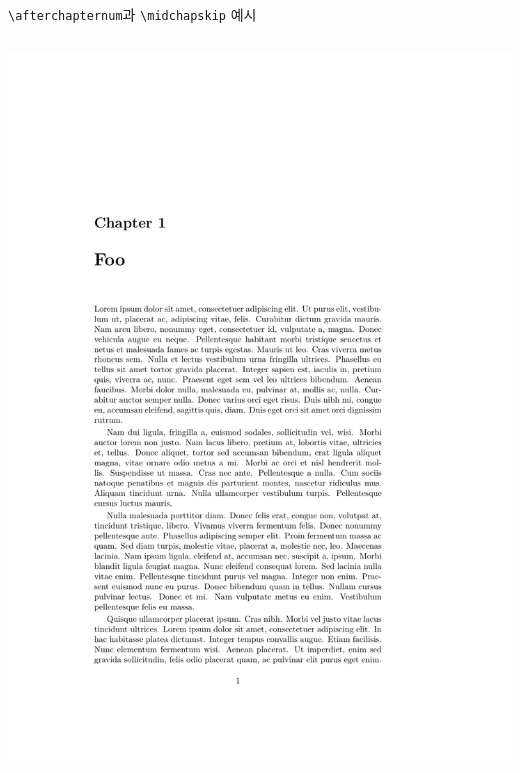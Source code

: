 \documentclass{beamer}
\def\tbs{\textbackslash}
\begin{document}
\begin{frame}[fragile]
  {\texttt{\tbs afterchapternum}과 \texttt{\tbs midchapskip} 예시}
  \begin{overprint}
    \begin{columns}
      \begin{column}{0.5\textwidth}
        \begin{latexcode}
          \setlength\midchapskip{20pt}
        \end{latexcode}
        \begin{center}
          \includegraphics[frame,page=1,width=0.8\linewidth]{examples/afterchapternum}
        \end{center}
      \end{column}


\end{columns}
\end{overprint}
\end{frame}
\end{document}
